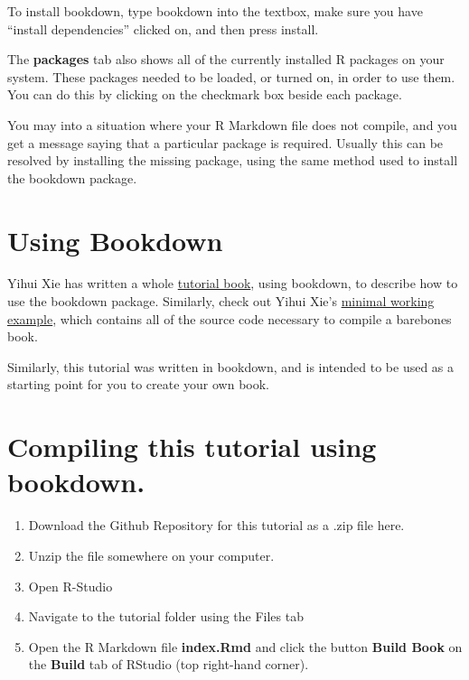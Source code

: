 \documentclass[]{book}
\providecommand{\tightlist}{%
  \setlength{\itemsep}{0pt}\setlength{\parskip}{0pt}}
\begin{document}
To install bookdown, type bookdown into the textbox, make sure you have
``install dependencies'' clicked on, and then press install.

The \textbf{packages} tab also shows all of the currently installed R
packages on your system. These packages needed to be loaded, or turned
on, in order to use them. You can do this by clicking on the checkmark
box beside each package.

You may into a situation where your R Markdown file does not compile,
and you get a message saying that a particular package is required.
Usually this can be resolved by installing the missing package, using
the same method used to install the bookdown package.

\section{Using Bookdown}\label{using-bookdown}

Yihui Xie has written a whole
\href{https://bookdown.org/yihui/bookdown/}{tutorial book}, using
bookdown, to describe how to use the bookdown package. Similarly, check
out Yihui Xie's
\href{https://bookdown.org/yihui/bookdown/get-started.html}{minimal
working example}, which contains all of the source code necessary to
compile a barebones book.

Similarly, this tutorial was written in bookdown, and is intended to be
used as a starting point for you to create your own book.

\section{Compiling this tutorial using
bookdown.}\label{compiling-this-tutorial-using-bookdown.}

\begin{enumerate}
\def\labelenumi{\arabic{enumi}.}
\tightlist
\item
  Download the Github Repository for this tutorial as a .zip file here.
\item
  Unzip the file somewhere on your computer.
\item
  Open R-Studio
\item
  Navigate to the tutorial folder using the Files tab
\item
  Open the R Markdown file \textbf{index.Rmd} and click the button
  \textbf{Build Book} on the \textbf{Build} tab of RStudio (top
  right-hand corner).
\end{enumerate}
\end{document}

